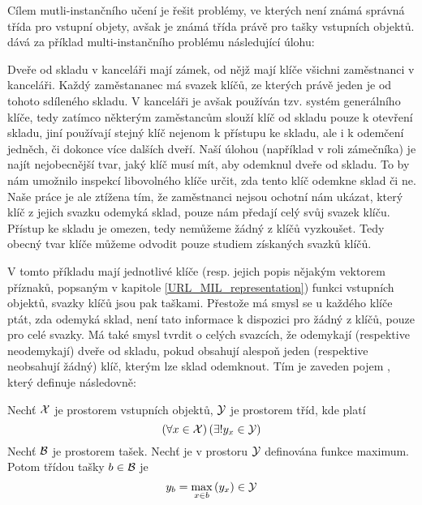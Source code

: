 Cílem mutli-instančního učení je řešit problémy, ve kterých není známá správná třída pro vstupní objety, avšak je známá třída právě pro tašky vstupních objektů. \cite{dietterich_solving_1997} dává za příklad multi-instančního problému následující úlohu:

\begin{example}
	Dveře od skladu v kanceláři mají zámek, od nějž mají klíče všichni zaměstnanci v kanceláři. Každý zaměstananec má svazek klíčů, ze kterých právě jeden je od tohoto sdíleného skladu. V kanceláři je avšak používán tzv. systém generálního klíče, tedy zatímco některým zaměstancům slouží klíč od skladu pouze k otevření skladu, jiní používají stejný klíč nejenom k přístupu ke skladu, ale i k odemčení jedněch, či dokonce více dalších dveří. Naší úlohou (například v roli zámečníka) je najít nejobecnější tvar, jaký klíč musí mít, aby odemknul dveře od skladu. To by nám umožnilo inspekcí libovolného klíče určit, zda tento klíč odemkne sklad či ne. Naše práce je ale ztížena tím, že zaměstnanci nejsou ochotní nám ukázat, který klíč z jejich svazku odemyká sklad, pouze nám předají celý svůj svazek klíču. Přístup ke skladu je omezen, tedy nemůžeme žádný z klíčů vyzkoušet. Tedy obecný tvar klíče můžeme odvodit pouze studiem získaných svazků klíčů.
\end{example}

V tomto příkladu mají jednotlivé klíče (resp. jejich popis nějakým vektorem příznaků, popsaným v kapitole \ref{URL_MIL_representation}) funkci vstupních objektů, svazky klíčů jsou pak taškami. Přestože má smysl se u každého klíče ptát, zda odemyká sklad, není tato informace k dispozici pro žádný z klíčů, pouze pro celé svazky. Má také smysl tvrdit o celých svazcích, že odemykají (respektive neodemykají) dveře od skladu, pokud obsahují alespoň jeden (respektive neobsahují žádný) klíč, kterým lze sklad odemknout. Tím je zaveden pojem , který \cite{dietterich_solving_1997} definuje následovně:

\begin{define}\label{baglabel}
	Nechť \( \mathcal X \) je prostorem vstupních objektů, \( \mathcal Y \) je prostorem tříd, kde platí
	\[ \left( \forall x \in \mathcal X \right) \left( \exists ! y_x \in \mathcal Y \right) \]
	Nechť \( \mathcal B \) je prostorem tašek. Nechť je v prostoru \( \mathcal Y \) definována funkce maximum. Potom třídou tašky \( b \in \mathcal B \) je
	\[ y_b = \max_{x \in b} \left( y_x \right) \in \mathcal Y \]
\end{define}

